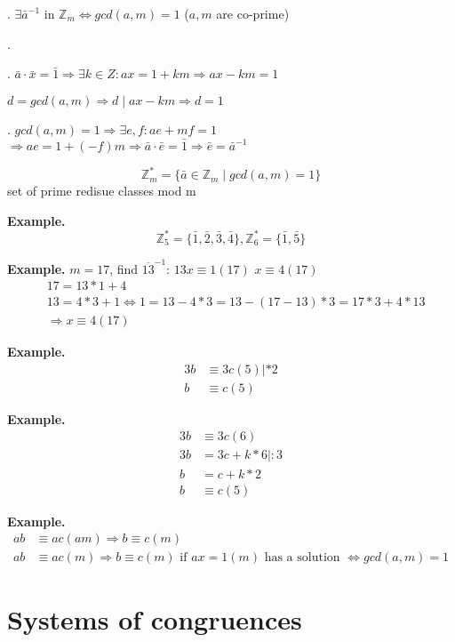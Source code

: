 \Theorem.
$\exists \bar{a}^{-1} \text{ in } \mathbb{Z}_m \iff gcd(a,m) = 1$ ($a,m$ are co-prime)

\Proof.

\ProofForward.
  $\bar{a}\cdot \bar{x} = \bar{1} \Rightarrow \exists k\in Z : 
  ax = 1 + km \Rightarrow ax - km = 1$

  $d = gcd(a,m) \Rightarrow d \mid ax - km \Rightarrow d = 1$

\ProofBackward.
  $gcd(a,m) = 1 \Rightarrow \exists e,f : ae + mf = 1$ \\
  $\Rightarrow ae = 1 + (-f)m \Rightarrow \bar{a} \cdot \bar{e} = \bar{1} \Rightarrow \bar{e} = \bar{a}^{-1}$

\begin{definition}
\[
  \mathbb{Z}_m^{*} = \{ \bar{a} \in \mathbb{Z}_m \mid gcd(a,m) = 1 \}
\]
set of prime redisue classes mod m
\end{definition}

\textbf{Example.}
\[
  \mathbb{Z}_5^{*} = \{ \bar{1}, \bar{2}, \bar{3}, \bar{4} \}, \mathbb{Z}_6^{*} = \{ \bar{1}, \bar{5} \}
\]

\textbf{Example.}
$ m = 17$, find $\overline{13}^{-1}$: $ 13 x \equiv 1 (17)$ $x \equiv 4 (17)$
\begin{align*}
  &17 = 13 * 1 +4\\
   &13 = 4*3 +1 \iff 1 = 13-4*3 = 13-(17-13)*3 = 17*3+4*13 \\
   & \Rightarrow x \equiv 4 (17)
\end{align*}

\textbf{Example.}
\begin{align*}
  3b &\equiv 3c (5) | *2 \\
  b &\equiv c(5)
\end{align*}

\textbf{Example.}
\begin{align*}
  3b &\equiv 3c (6) \\
  3b &= 3c + k*6 | :3 \\
  b &= c + k*2 \\
  b &\equiv c(5)
\end{align*}

\textbf{Example.}
\begin{align*}
  ab &\equiv ac (am) \Rightarrow b \equiv  c (m) \\
  ab &\equiv ac (m) \Rightarrow b \equiv c (m)
    \text{ if } ax = 1 (m) \text{ has a solution } \iff gcd(a,m) = 1
\end{align*}

\section{Systems of congruences}

